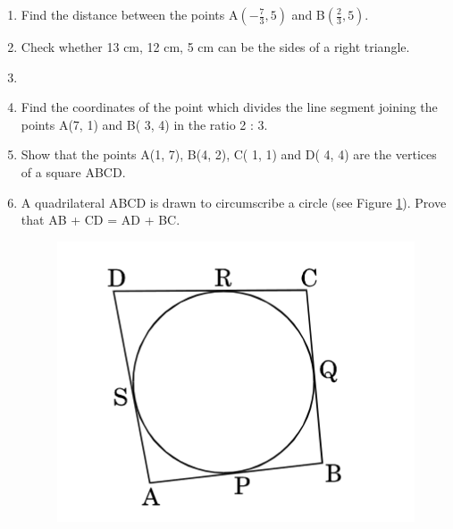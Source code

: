 \documentclass{exam}
\begin{document}
\begin{enumerate}
		
		\item Find the distance between the points A$(-\frac{7}{3},5)$ and B$(\frac{2}{3},5)$.
		
		\item Check whether 13 cm, 12 cm, 5 cm can be the sides of a right triangle.
		
		\item
		
		\item Find the coordinates of the point which divides the line segment joining the points A(7, 1) and B( 3, 4) in the ratio 2 : 3. 
		
		\item Show that the points A(1, 7), B(4, 2), C( 1, 1) and D( 4, 4) are the vertices of a square ABCD. 
		
		\item A quadrilateral ABCD is drawn to circumscribe a circle (see Figure \ref{fig:leaf}). Prove that AB + CD = AD + BC.

		\begin{figure}[h]
        \centering
        \includegraphics[scale=0.3]{2.jpg}
        \caption{}
        \label{fig:leaf}
        \end{figure}
            

\end{enumerate}
\end{document}
